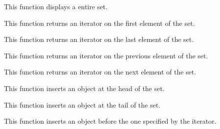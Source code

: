 This function displays a entire set.


This function returns an iterator on the first element of the set.


This function returns an iterator on the last element of the set.


This function returns an iterator on the previous element of the set.


This function returns an iterator on the next element of the set.


This function inserts an object at the head of the set.


This function inserts an object at the tail of the set.


This function inserts an object before the one specified by the iterator.


